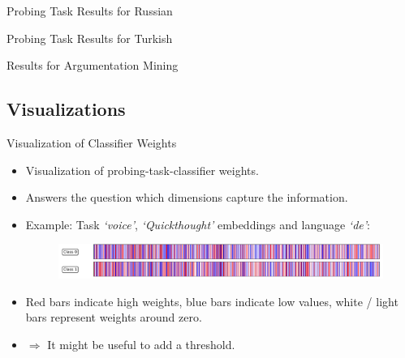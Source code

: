 \documentclass[accentcolor=tud1a,colorbacktitle,inverttitle,landscape,german,presentation,t]{tudbeamer}
\begin{document}
\begin{frame}{Probing Task Results for Russian}{}
	\vspace*{-8mm}
	
\end{frame}


\begin{frame}{Probing Task Results for Turkish}{}
	\vspace*{-8mm}
	
\end{frame}


\begin{frame}{Results for Argumentation Mining}{}
	\vspace*{-8mm}
	
\end{frame}


\subsection*{Visualizations}


\begin{frame}{Visualization of Classifier Weights}{}
	\vspace*{-4mm}
	\begin{itemize}
		\item Visualization of probing-task-classifier weights.
		\item Answers the question which dimensions capture the information.
		\item Example: Task \textit{`voice'}, \textit{`Quickthought'} embeddings and language \textit{`de'}:
		\vspace*{4mm}
		\begin{figure}
			\centering
			\includegraphics[scale=0.6]{images/weights_voice_qt}
		\end{figure}
		\vspace*{4mm}
		\item Red bars indicate high weights, blue bars indicate low values, white / light bars represent weights around zero.
		\item $\Rightarrow$ It might be useful to add a threshold.
	\end{itemize}
\end{frame}
\end{document}
